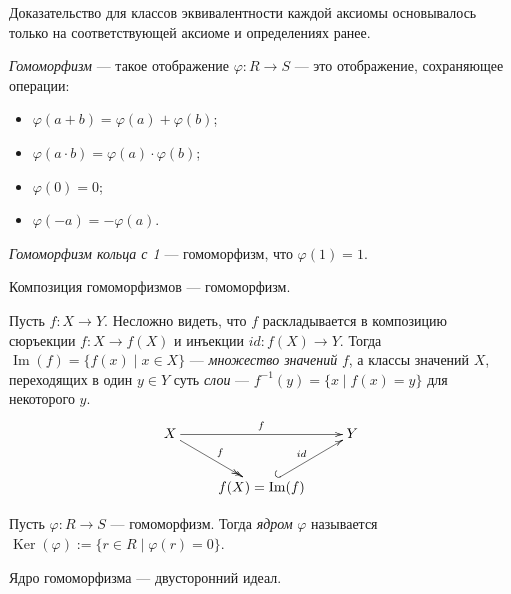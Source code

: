 \documentclass[12pt,a4paper]{article}
\DeclareMathOperator{\Img}{Im}
\DeclareMathOperator{\Ker}{Ker}
\begin{document}
    \begin{remark}
        Доказательство для классов эквивалентности каждой аксиомы основывалось только на соответствующей аксиоме и определениях ранее.
    \end{remark}

    \begin{definition}
        \emph{Гомоморфизм} --- такое отображение $\varphi: R \to S$ --- это отображение, сохраняющее операции:
        \begin{itemize}
            \item $\varphi(a + b) = \varphi(a) + \varphi(b)$;
            \item $\varphi(a \cdot b) = \varphi(a) \cdot \varphi(b)$;
            \item $\varphi(0) = 0$;
            \item $\varphi(-a) = -\varphi(a)$.
        \end{itemize}

        \emph{Гомоморфизм кольца с 1} --- гомоморфизм, что $\varphi(1) = 1$.
    \end{definition}

    \begin{statement}
        Композиция гомоморфизмов --- гомоморфизм.
    \end{statement}

    \begin{definition}
            Пусть $f: X \to Y$. Несложно видеть, что $f$ раскладывается в композицию сюръекции $f: X \to f(X)$ и инъекции $id: f(X) \to Y$. Тогда $\Img(f) = \{f(x) \mid x \in X\}$ --- \emph{множество значений} $f$, а классы значений $X$, переходящих в один $y\in Y$ суть \emph{слои} --- $f^{-1}(y) = \{x \mid f(x) = y\}$ для некоторого $y$.
        \[
            \xymatrix{
                X \ar@{->>}[rd]^f \ar[rr]^f && Y\\
                & f(X) = \Img(f) \ar@{^{(}->}[ur]^{id}
            }
        \]
    \end{definition}

    \begin{definition}
        Пусть $\varphi: R \to S$ --- гомоморфизм. Тогда \emph{ядром} $\varphi$ называется $\Ker(\varphi) := \{r \in R \mid \varphi(r) = 0\}$.
    \end{definition}

    \begin{statement}
        Ядро гомоморфизма --- двусторонний идеал.
    \end{statement}
\end{document}

